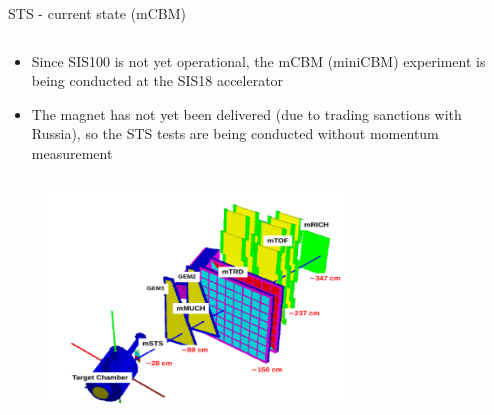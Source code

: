 \begin{columnframe}{STS - current state (mCBM)}
    \begin{column}{0.5\textwidth}
        \begin{itemize}
            \item Since SIS100 is not yet operational, the mCBM (miniCBM) experiment is being
                  conducted at the SIS18 accelerator
            \item The magnet has not yet been delivered (due to trading sanctions with Russia),
                  so the STS tests are being conducted without momentum measurement
        \end{itemize}
    \end{column}
    \begin{column}{0.5\textwidth}
        \begin{figure}
            \centering
            \includegraphics[width=0.7\textwidth, frame]{images/mCBM_render.png}
        \end{figure}
    \end{column}
\end{columnframe}


